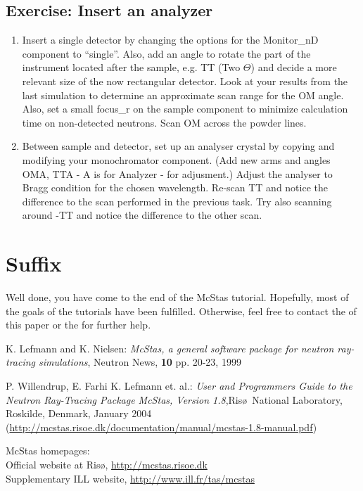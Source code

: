 \documentclass[a4paper]{article}
\begin{document}
\subsection{Exercise: Insert an analyzer}
\begin{enumerate}
\item{Insert a single detector by changing the options for the
    Monitor\_nD component to ``single''. Also, add an angle to rotate
    the part of the instrument located after the sample, e.g. TT (Two
    $\Theta$) and decide a more relevant size of the now rectangular detector. Look at your results from the last simulation to
    determine an approximate scan range for the OM angle. Also,
    set a small focus\_r on the sample component to minimize
    calculation time on non-detected neutrons. Scan OM across the
    powder lines.}
\item{Between sample and detector, set up an analyser crystal by
    copying and modifying your monochromator component. (Add new arms
    and angles OMA, TTA - A is for Analyzer - for adjusment.) 
    Adjust the analyser to Bragg condition
    for the chosen wavelength. Re-scan TT and notice the difference to
    the scan performed in the previous task. Try also scanning around
    -TT and notice the difference to the other scan.}
\end{enumerate}
\section{Suffix}
Well done, you have come to the end of the McStas tutorial. Hopefully,
most of the goals of the tutorials have been fulfilled. Otherwise,
feel free to contact the
of this paper or the  for further help.

\begin{thebibliography}{10}
K. Lefmann and K. Nielsen: \emph{McStas, a general software package
  for neutron ray-tracing simulations}, Neutron News, {\bf 10} pp. 20-23, 1999

P. Willendrup, E. Farhi K. Lefmann et. al.: \emph{User and Programmers Guide to the Neutron Ray-Tracing Package McStas, Version 1.8},Ris\o\ National Laboratory, Roskilde, Denmark, January 2004\\
\newblock (\url{http://mcstas.risoe.dk/documentation/manual/mcstas-1.8-manual.pdf})

McStas homepages:\\
\newblock Official website at Ris\o, \url{http://mcstas.risoe.dk}\\
\newblock Supplementary ILL website, \url{http://www.ill.fr/tas/mcstas}\\
\end{thebibliography}
\end{document}

